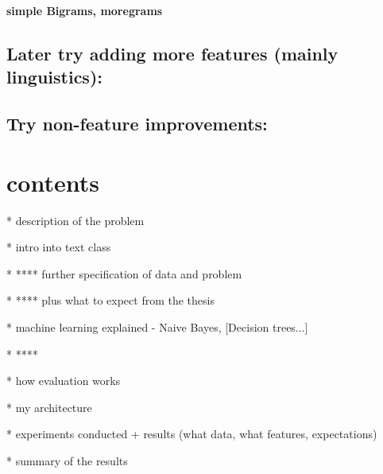 \bf simple Bigrams, moregrams\rm


\subsection{Later try adding more features (mainly linguistics):}






\subsection{Try non-feature improvements:}






\section{contents}

* description of the problem

* intro into text class

* **** further specification of data and problem

* **** plus what to expect from the thesis

* machine learning explained - Naive Bayes, [Decision trees...]

* ****\todoB[PCA...]

* how evaluation works

* my architecture

* experiments conducted + results (what data, what features, expectations) 

* summary of the results
